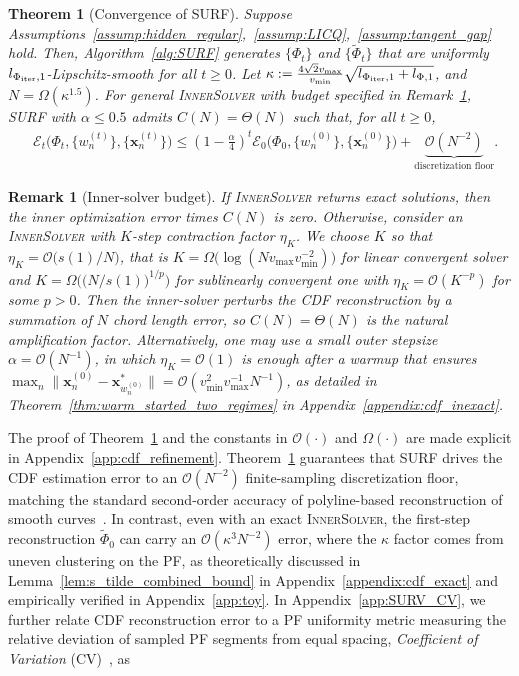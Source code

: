 \documentclass{article}
\newtheorem{remark}{Remark}
\newtheorem{theorem}{Theorem}
\newcommand{\Oc}{\mathcal{O}}
\newcommand{\bx}{\mathbf{x}}
\newcommand{\Farc}{\Phi}
\begin{document}
\begin{leftrulebox}
\begin{theorem}[Convergence of SURF]
\label{thm:cdf}
Suppose Assumptions~\ref{assump:hidden_regular},~\ref{assump:LICQ},~\ref{assump:tangent_gap} hold. Then, Algorithm~\ref{alg:SURF} generates $\{\Farc_t\}$ and $\{\tilde\Farc_t\}$ that are uniformly $l_{\Farc_{\rm iter},1}$-Lipschitz-smooth for all $t\geq 0$. Let $\kappa := \frac{4\sqrt{2}v_{\max}}{v_{\min}}\sqrt{l_{\Farc_{\rm iter},1}+l_{\Farc,1}}$, and $N=\Omega(\kappa^{1.5})$.
For general \textsc{InnerSolver} with budget specified in Remark~\ref{remark:Kchoice}, SURF with $\alpha \leq 0.5$ admits   $C(N)=\Theta(N)$ such that, for all $t\ge0$,
\begin{align}\label{eq:inexact_SURFconvergence}
& \mathcal E_t\big(\Phi_t, \{w_n^{(t)}\}, \{\mathbf{x}_n^{(t)}\}\big) 
\leq  \left(1-\frac{\alpha}{4}\right)^t 
\mathcal E_0\big(\Phi_0, \{w_n^{(0)}\}, \{\mathbf{x}_n^{(0)}\}\big)
+\underbrace{\Oc(N^{-2})}_{\text{discretization floor}}. 
\end{align}
\end{theorem}
\end{leftrulebox}
\begin{remark}[Inner-solver budget]
\label{remark:Kchoice}
If \textsc{InnerSolver} returns exact solutions, then the inner optimization error times $C(N)$ is zero.
Otherwise, consider an \textsc{InnerSolver} with $K$-step contraction factor $\eta_K$. We choose $K$ so that $\eta_K=\Oc\big({s(1)}/{N}\big)$, that is $K=\Omega\big(\log ({Nv_{\max}}{v_{\min}^{-2}}) \big)$ for linear convergent solver and $K=\Omega\big(\big( {N}/{s(1)}\big)^{1/p}\big)$ for sublinearly convergent one with $\eta_K=\Oc(K^{-p})$ for some $p>0$.
Then the inner-solver perturbs the CDF reconstruction by a summation of $N$ chord length error, so $C(N) = \Theta(N)$ is the natural amplification factor.
Alternatively, one may use a small outer stepsize $\alpha=\Oc(N^{-1})$, in which $\eta_K=\Oc(1)$ is enough after a warmup that ensures $\max_n\|\bx_n^{(0)}-\bx_{w_n^{(0)}}^*\|=\Oc\left({v_{\min}^2}v_{\max}^{-1}N^{-1}\right)$, as detailed in Theorem~\ref{thm:warm_started_two_regimes} in Appendix~\ref{appendix:cdf_inexact}.
\end{remark}
The proof of Theorem~\ref{thm:cdf} and the constants in $\Oc(\cdot)$ and $\Omega(\cdot)$ are made explicit in Appendix~\ref{app:cdf_refinement}. 
Theorem~\ref{thm:cdf} guarantees that SURF drives the CDF estimation error to an $\Oc(N^{-2})$ finite-sampling discretization floor, matching the standard second-order accuracy of polyline-based reconstruction of smooth curves~\citep{suli2003introduction}. In contrast, even with an exact \textsc{InnerSolver}, the first-step reconstruction $\tilde \Farc_0$ can carry an $\Oc(\kappa^3N^{-2})$ error, where the $\kappa$ factor comes from uneven clustering on the PF, as theoretically discussed in Lemma~\ref{lem:s_tilde_combined_bound} in Appendix~\ref{appendix:cdf_exact} and empirically verified in Appendix~\ref{app:toy}. In Appendix~\ref{app:SURV_CV}, we further relate CDF reconstruction error to a PF uniformity metric measuring the relative deviation of sampled PF segments from equal spacing, \textit{Coefficient of Variation} (CV)~\citep{everitt2002cambridge}, as
\end{document}
